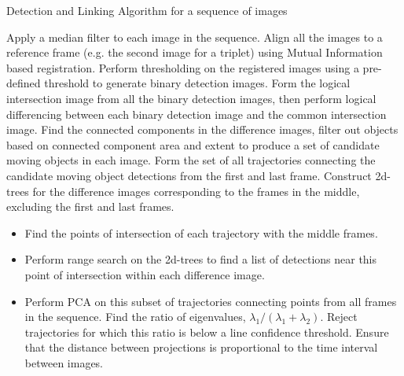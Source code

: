\documentclass{article}
\begin{document}
\vspace{-0.35cm}
\begin{algorithm}[H]
\small
\caption{Detection and Linking Algorithm for a sequence of images}
\label{algo:Trajectory_Linking}
\begin{algorithmic}[1]
\State Apply a median filter to each image in the sequence.
\State Align all the images to a reference frame (e.g. the second image for a triplet) using Mutual Information based registration.
\State Perform thresholding on the registered images using a pre-defined threshold to generate  binary detection images. 
\State Form the logical intersection image from all the binary detection images, then perform logical differencing between each binary detection image and the common intersection image.
\State Find the connected components in the difference images, filter out objects based on connected component area and extent to produce a set of candidate moving objects in each image.
\State Form the set of all trajectories connecting the candidate moving object detections from the first and last frame.
\State Construct 2d-trees for the difference images corresponding to the frames in the middle, excluding the first and last frames. 
\begin{itemize}
    \item{Find the points of intersection of each trajectory with the middle frames.}
    \item{Perform range search on the 2d-trees to find a list of detections near this point of intersection within each difference image.}
    \item{Perform PCA on this subset of trajectories connecting points from all frames in the sequence. Find the ratio of eigenvalues, $\lambda_{1}/(\lambda_{1}+ \lambda_{2})$. Reject trajectories for which this ratio is below a line confidence threshold. Ensure that the distance between projections is proportional to the time interval between images.}

\end{itemize}
\end{algorithmic}
\end{algorithm}
\end{document}
